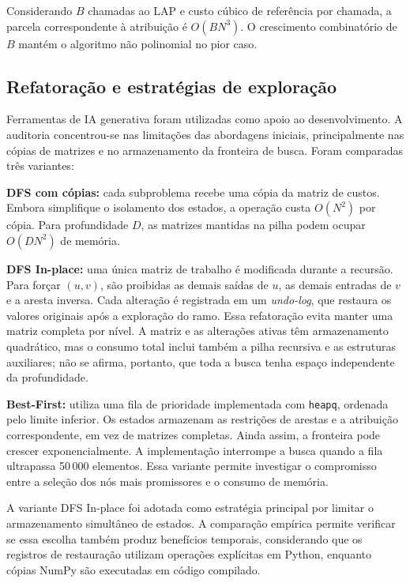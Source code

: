 Considerando $B$ chamadas ao LAP e custo cúbico de referência por chamada, a parcela correspondente à atribuição é $O(BN^3)$. O crescimento combinatório de $B$ mantém o algoritmo não polinomial no pior caso.

\subsection{Refatoração e estratégias de exploração}

Ferramentas de IA generativa foram utilizadas como apoio ao desenvolvimento. A auditoria concentrou-se nas limitações das abordagens iniciais, principalmente nas cópias de matrizes e no armazenamento da fronteira de busca. Foram comparadas três variantes:

\textbf{DFS com cópias:} cada subproblema recebe uma cópia da matriz de custos. Embora simplifique o isolamento dos estados, a operação custa $O(N^2)$ por cópia. Para profundidade $D$, as matrizes mantidas na pilha podem ocupar $O(DN^2)$ de memória.

\textbf{DFS In-place:} uma única matriz de trabalho é modificada durante a recursão. Para forçar $(u,v)$, são proibidas as demais saídas de $u$, as demais entradas de $v$ e a aresta inversa. Cada alteração é registrada em um \textit{undo-log}, que restaura os valores originais após a exploração do ramo. Essa refatoração evita manter uma matriz completa por nível. A matriz e as alterações ativas têm armazenamento quadrático, mas o consumo total inclui também a pilha recursiva e as estruturas auxiliares; não se afirma, portanto, que toda a busca tenha espaço independente da profundidade.

\textbf{Best-First:} utiliza uma fila de prioridade implementada com \texttt{heapq}, ordenada pelo limite inferior. Os estados armazenam as restrições de arestas e a atribuição correspondente, em vez de matrizes completas. Ainda assim, a fronteira pode crescer exponencialmente. A implementação interrompe a busca quando a fila ultrapassa 50\,000 elementos. Essa variante permite investigar o compromisso entre a seleção dos nós mais promissores e o consumo de memória.

A variante DFS In-place foi adotada como estratégia principal por limitar o armazenamento simultâneo de estados. A comparação empírica permite verificar se essa escolha também produz benefícios temporais, considerando que os registros de restauração utilizam operações explícitas em Python, enquanto cópias NumPy são executadas em código compilado.

